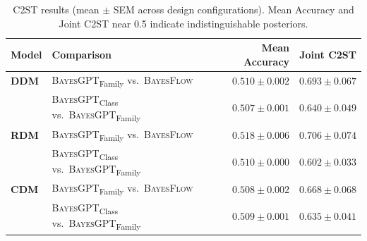 \begin{table}[ht]
\centering
\small
\caption{C2ST results (mean $\pm$ SEM across design configurations). Mean Accuracy and Joint C2ST near 0.5 indicate indistinguishable posteriors.}
\label{tab:c2st}
\begin{tabular}{llrr}
\toprule
\textbf{Model} & \textbf{Comparison} & Mean Accuracy & Joint C2ST \\
\midrule
\textbf{DDM} & \textsc{BayesGPT}\textsubscript{Family} vs.\ \textsc{BayesFlow} & $0.510 \pm 0.002$ & $0.693 \pm 0.067$ \\
 & \textsc{BayesGPT}\textsubscript{Class} vs.\ \textsc{BayesGPT}\textsubscript{Family} & $0.507 \pm 0.001$ & $0.640 \pm 0.049$ \\
\midrule
\textbf{RDM} & \textsc{BayesGPT}\textsubscript{Family} vs.\ \textsc{BayesFlow} & $0.518 \pm 0.006$ & $0.706 \pm 0.074$ \\
 & \textsc{BayesGPT}\textsubscript{Class} vs.\ \textsc{BayesGPT}\textsubscript{Family} & $0.510 \pm 0.000$ & $0.602 \pm 0.033$ \\
\midrule
\textbf{CDM} & \textsc{BayesGPT}\textsubscript{Family} vs.\ \textsc{BayesFlow} & $0.508 \pm 0.002$ & $0.668 \pm 0.068$ \\
 & \textsc{BayesGPT}\textsubscript{Class} vs.\ \textsc{BayesGPT}\textsubscript{Family} & $0.509 \pm 0.001$ & $0.635 \pm 0.041$ \\
\bottomrule
\end{tabular}
\end{table}